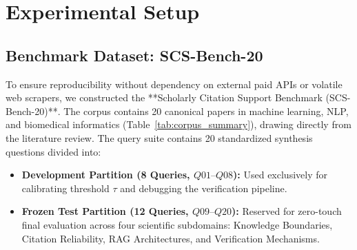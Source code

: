 \documentclass[acmsmall,screen]{acmart}
\begin{document}
\section{Experimental Setup}

\subsection{Benchmark Dataset: SCS-Bench-20}
To ensure reproducibility without dependency on external paid APIs or volatile web scrapers, we constructed the **Scholarly Citation Support Benchmark (SCS-Bench-20)**. The corpus contains 20 canonical papers in machine learning, NLP, and biomedical informatics (Table~\ref{tab:corpus_summary}), drawing directly from the literature review. The query suite contains 20 standardized synthesis questions divided into:
\begin{itemize}
    \item \textbf{Development Partition (8 Queries, $Q01\text{--}Q08$):} Used exclusively for calibrating threshold $\tau$ and debugging the verification pipeline.
    \item \textbf{Frozen Test Partition (12 Queries, $Q09\text{--}Q20$):} Reserved for zero-touch final evaluation across four scientific subdomains: Knowledge Boundaries, Citation Reliability, RAG Architectures, and Verification Mechanisms.
\end{itemize}
\end{document}
